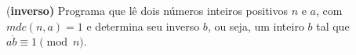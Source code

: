 \item{(\bf inverso)}
		Programa que lê dois números inteiros positivos $n$ e $a$, com $mdc(n,a)=1$ e determina seu inverso $b$, ou seja, um inteiro $b$ tal que $a\dot b\equiv 1 \pmod{n}$.
